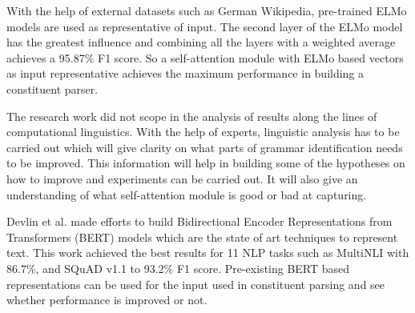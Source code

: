\documentclass[a4paper, 11pt]{article}
\begin{document}
With the help of external datasets such as German Wikipedia, pre-trained ELMo models are used as representative of input. The second layer of the ELMo model has the greatest influence and combining all the layers with a weighted average achieves a 95.87\% F1 score. So a self-attention module with ELMo based vectors as input representative achieves the maximum performance in building a constituent parser. 

The research work did not scope in the analysis of results along the lines of computational linguistics. With the help of experts, linguistic analysis has to be carried out which will give clarity on what parts of grammar identification needs to be improved. This information will help in building some of the hypotheses on how to improve and experiments can be carried out. It will also give an understanding of what self-attention module is good or bad at capturing.

Devlin et al. made efforts to build Bidirectional Encoder Representations from Transformers (BERT) \parencite{devlin2018bert} models which are the state of art techniques to represent text. This work achieved the best results for 11 NLP tasks such as MultiNLI with 86.7\%, and SQuAD v1.1 to 93.2\% F1 score. Pre-existing BERT based representations can be used for the input used in constituent parsing and see whether performance is improved or not.

\newpage
\printbibliography
\end{document}
